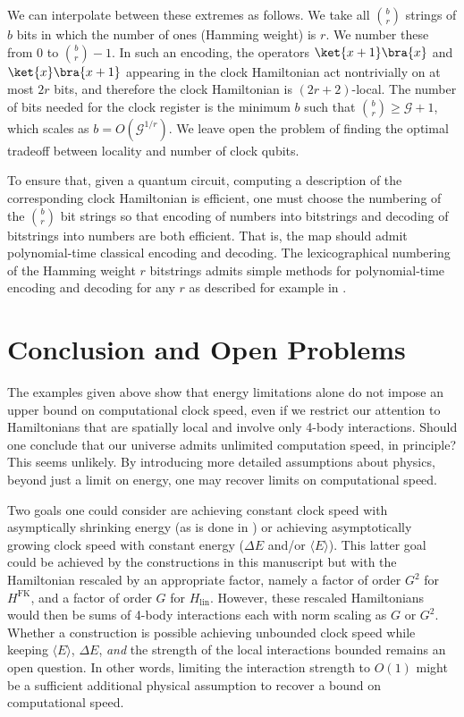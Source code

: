 \documentclass[11pt]{article}
\begin{document}
We can interpolate between these extremes as follows. We take all $\binom{b}{r}$ strings of $b$ bits in which the number of ones (Hamming weight) is $r$. We number these from 0 to $\binom{b}{r}-1$. In such an encoding, the operators $\ket{x+1}\bra{x}$ and $\ket{x}\bra{x+1}$ appearing in the clock Hamiltonian act nontrivially on at most $2r$ bits, and therefore the clock Hamiltonian is $(2r+2)$-local. The number of bits needed for the clock register is the minimum $b$ such that $\binom{b}{r} \geq \mathcal{G}+1$, which scales as $b=O(\mathcal{G}^{1/r})$. We leave open the problem of finding the optimal tradeoff between locality and number of clock qubits.

To ensure that, given a quantum circuit, computing a description of the corresponding clock Hamiltonian is efficient, one must choose the numbering of the $\binom{b}{r}$ bit strings so that encoding of numbers into bitstrings and decoding of bitstrings into numbers are both efficient. That is, the map should admit polynomial-time classical encoding and decoding. The lexicographical numbering of the Hamming weight $r$ bitstrings admits simple methods for polynomial-time encoding and decoding for any $r$ as described for example in \cite{C71}.

\section{Conclusion and Open Problems}
\label{sec:conclusion}

The examples given above show that energy limitations alone do not impose an upper bound on computational clock speed, even if we restrict our attention to Hamiltonians that are spatially local and involve only 4-body interactions. Should one conclude that our universe admits unlimited computation speed, in principle? This seems unlikely. By introducing more detailed assumptions about physics, beyond just a limit on energy, one may recover limits on computational speed.

Two goals one could consider are achieving constant clock speed with asymptically shrinking energy (as is done in ) or achieving asymptotically growing clock speed with constant energy ($\Delta E$ and/or $\langle E \rangle$). This latter goal could be achieved by the constructions in this manuscript but with the Hamiltonian rescaled by an appropriate factor, namely a factor of order $G^2$ for $H^{\mathrm{FK}}$, and a factor of order $G$ for $H_{\mathrm{lin}}$. However, these rescaled Hamiltonians would then be sums of 4-body interactions each with norm scaling as $G$ or $G^2$. Whether a construction is possible achieving unbounded clock speed while keeping $\langle E \rangle$, $\Delta E$, \emph{and} the strength of the local interactions bounded remains an open question. In other words, limiting the interaction strength to $O(1)$ might be a sufficient additional physical assumption to recover a bound on computational speed.
\end{document}
